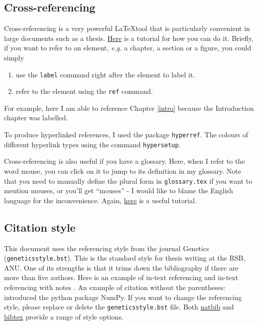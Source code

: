 \subsection{Cross-referencing}
Cross-referencing is a very powerful \LaTeX tool that is particularly convenient in large documents such as a thesis. \href{https://www.overleaf.com/learn/latex/Cross_referencing_sections\%2C_equations_and_floats}{Here} is a tutorial for how you can do it. Briefly, if you want to refer to an element, \textit{e.g.} a chapter, a section or a figure, you could simply 

\begin{enumerate}
    \item use the \texttt{label} command right after the element to label it.
    \item refer to the element using the \texttt{ref} command.
\end{enumerate}

For example, here I am able to reference Chapter \ref{intro} because the Introduction chapter was labelled. 

To produce hyperlinked references, I used the package \texttt{hyperref}. The colours of different hyperlink types using the command \texttt{hypersetup}.

Cross-referencing is also useful if you have a glossary. Here, when I refer to the word \gls{mouse}, you can click on it to jump to its definition in my glossary. Note that you need to manually define the plural form in \texttt{glossary.tex} if you want to mention \glspl{mouse}, or you'll get ``mouses'' - I would like to blame the English language for the inconvenience. Again, \href{https://www.overleaf.com/learn/latex/Glossaries}{here} is a useful tutorial.

\subsection{Citation style}

This document uses the referencing style from the journal Genetics (\texttt{geneticsstyle.bst}). This is the standard style for thesis writing at the RSB, ANU. One of its strengths is that it trims down the bibliography if there are more than five authors. Here is an example of in-text referencing \citep{harris2020array} and in-text referencing with notes \citep[Note: NumPy is cool;][]{harris2020array}. An example of citation without the parentheses: \citet{harris2020array} introduced the python package NumPy. If you want to change the referencing style, please replace or delete the \texttt{geneticsstyle.bst} file. Both \href{https://www.overleaf.com/learn/latex/Natbib_bibliography_styles}{natbib} and \href{https://www.overleaf.com/learn/latex/Bibtex_bibliography_styles}{bibtex} provide a range of style options.  

